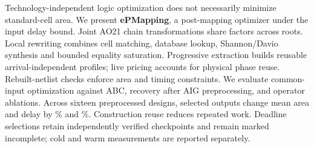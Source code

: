 Technology-independent logic optimization does not necessarily minimize standard-cell area. We present \textbf{ePMapping}, a post-mapping optimizer under the input delay bound. Joint AO21 chain transformations share factors across roots. Local rewriting combines cell matching, database lookup, Shannon/Davio synthesis and bounded equality saturation. Progressive extraction builds reusable arrival-independent profiles; live pricing accounts for physical phase reuse. Rebuilt-netlist checks enforce area and timing constraints. We evaluate common-input optimization against ABC, recovery after AIG preprocessing, and operator ablations. Across sixteen preprocessed designs, selected outputs change mean area and delay by \OwnArea\% and \OwnDelay\%. Construction reuse reduces repeated work. Deadline selections retain independently verified checkpoints and remain marked incomplete; cold and warm measurements are reported separately.
